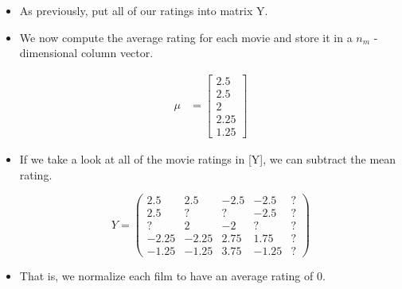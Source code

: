 \documentclass{article}
\begin{document}
\begin{itemize}
  \item As previously, put all of our ratings into matrix Y.
  \item We now compute the average rating for each movie and store it in a $n_m$ - dimensional column vector.

        \begin{align*}
          \mu & = \begin{bmatrix}
            2.5  \\
            2.5  \\
            2    \\
            2.25 \\
            1.25
          \end{bmatrix}
        \end{align*}

  \item If we take a look at all of the movie ratings in [Y], we can subtract the mean rating.

        \begin{equation*}
          Y =
          \begin{pmatrix}
            2.5   & 2.5   & -2.5 & -2.5  & ? \\
            2.5   & ?     & ?    & -2.5  & ? \\
            ?     & 2     & -2   & ?     & ? \\
            -2.25 & -2.25 & 2.75 & 1.75  & ? \\
            -1.25 & -1.25 & 3.75 & -1.25 & ?
          \end{pmatrix}
        \end{equation*}

  \item That is, we normalize each film to have an average rating of 0.

\end{itemize}
\end{document}
